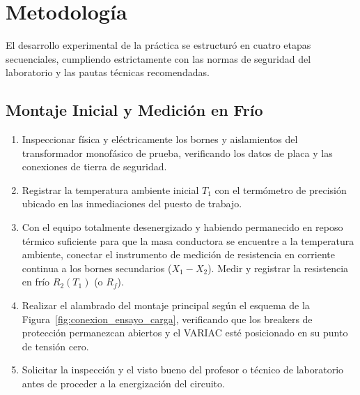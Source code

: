 \section{Metodología}

El desarrollo experimental de la práctica se estructuró en cuatro etapas secuenciales, cumpliendo estrictamente con las normas de seguridad del laboratorio y las pautas técnicas recomendadas.

\subsection{Montaje Inicial y Medición en Frío}
\begin{enumerate}
    \item Inspeccionar física y eléctricamente los bornes y aislamientos del transformador monofásico de prueba, verificando los datos de placa y las conexiones de tierra de seguridad.
    \item Registrar la temperatura ambiente inicial $T_1$ con el termómetro de precisión ubicado en las inmediaciones del puesto de trabajo.
    \item Con el equipo totalmente desenergizado y habiendo permanecido en reposo térmico suficiente para que la masa conductora se encuentre a la temperatura ambiente, conectar el instrumento de medición de resistencia en corriente continua a los bornes secundarios ($X_1 - X_2$). Medir y registrar la resistencia en frío $R_2(T_1)$ (o $R_f$).
    \item Realizar el alambrado del montaje principal según el esquema de la Figura~\ref{fig:conexion_ensayo_carga}, verificando que los breakers de protección permanezcan abiertos y el VARIAC esté posicionado en su punto de tensión cero.
    \item Solicitar la inspección y el visto bueno del profesor o técnico de laboratorio antes de proceder a la energización del circuito.
\end{enumerate}


